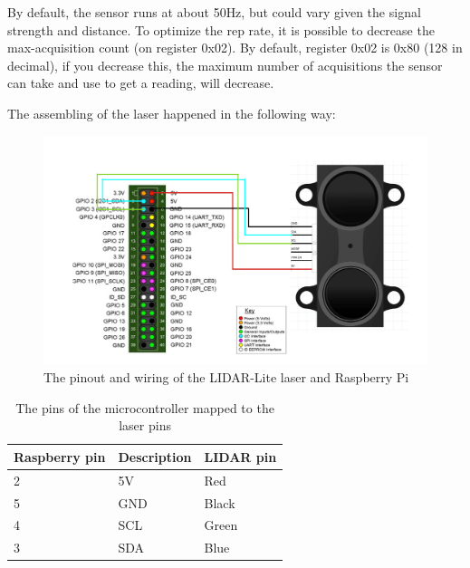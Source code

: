 By default, the sensor runs at about 50Hz, but could vary given the signal strength and distance. To optimize the rep rate, it is possible to decrease the max-acquisition count (on register 0x02). By default, register 0x02 is 0x80 (128 in decimal), if you decrease this, the maximum number of acquisitions the sensor can take and use to get a reading, will decrease\cite{reprate}.

\pagebreak

The assembling of the laser happened in the following way:

\begin{figure}[H]
	\centering
	\includegraphics[scale=.35]{images/laderraspberryconnection.png}
	\caption{The pinout and wiring of the LIDAR-Lite laser and Raspberry Pi}
	\label{fig:wiringlidarpi}
\end{figure}

\begin{table}[H]
	\centering
	\begin{tabular}{|l|l|l|}
		\hline
		\textbf{Raspberry pin} & \textbf{Description} & \textbf{LIDAR pin} \\ \hline
		2 & 5V & Red \\ \hline
		5 & GND & Black \\ \hline
		4 & SCL & Green \\ \hline
		3 & SDA & Blue \\ \hline
	\end{tabular}
	\caption{The pins of the microcontroller mapped to the laser pins}
\end{table}

